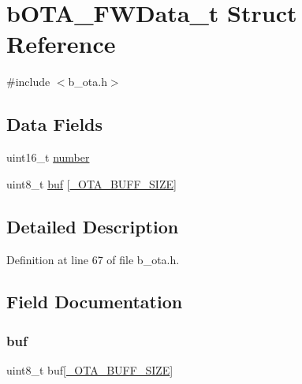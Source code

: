 \hypertarget{structb_o_t_a___f_w_data__t}{}\section{b\+O\+T\+A\+\_\+\+F\+W\+Data\+\_\+t Struct Reference}
\label{structb_o_t_a___f_w_data__t}


{\ttfamily \#include $<$b\+\_\+ota.\+h$>$}

\subsection*{Data Fields}
\begin{DoxyCompactItemize}
\item 
uint16\+\_\+t \mbox{\hyperlink{structb_o_t_a___f_w_data__t_adf69c46b3dd2878c66bab78eddc40b04}{number}}
\item 
uint8\+\_\+t \mbox{\hyperlink{structb_o_t_a___f_w_data__t_a5b1ae998eed54d1d68c0163bab9fbf5f}{buf}} \mbox{[}\mbox{\hyperlink{b__config_8h_a771e0a2ceaed0caf6945c2774e68324a}{\+\_\+\+O\+T\+A\+\_\+\+B\+U\+F\+F\+\_\+\+S\+I\+ZE}}\mbox{]}
\end{DoxyCompactItemize}


\subsection{Detailed Description}


Definition at line 67 of file b\+\_\+ota.\+h.



\subsection{Field Documentation}
\mbox{\label{structb_o_t_a___f_w_data__t_a5b1ae998eed54d1d68c0163bab9fbf5f}} 
\subsubsection{\texorpdfstring{buf}{buf}}
{\footnotesize\ttfamily uint8\+\_\+t buf\mbox{[}\mbox{\hyperlink{b__config_8h_a771e0a2ceaed0caf6945c2774e68324a}{\+\_\+\+O\+T\+A\+\_\+\+B\+U\+F\+F\+\_\+\+S\+I\+ZE}}\mbox{]}}



